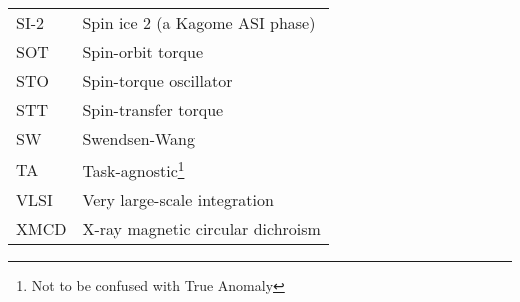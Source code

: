 {\begin{longtable}[l]{ll}
        SI-2  & Spin ice 2 (a Kagome ASI phase)             \\
        SOT   & Spin-orbit torque                           \\
        STO   & Spin-torque oscillator                      \\
        STT   & Spin-transfer torque                        \\
        SW    & Swendsen-Wang                               \\ %
        TA    & Task-agnostic\footnote{Not to be confused with True Anomaly} \\
        VLSI  & Very large-scale integration                \\
        XMCD  & X-ray magnetic circular dichroism           \\
    \end{longtable}
}

